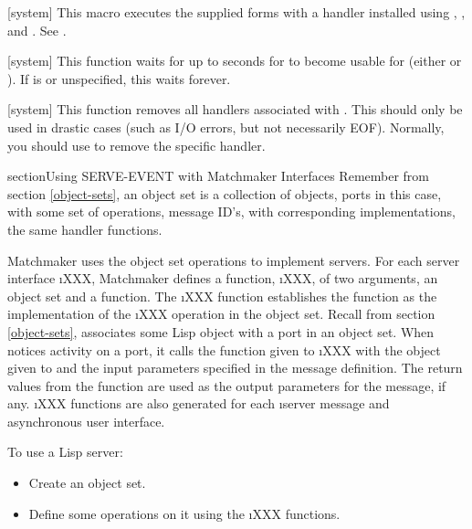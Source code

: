{[system]{
        }
 This macro executes the supplied forms with a handler installed using ,
, and .  See .
\enddefmac

[system]{
        }
 This function waits for up to  seconds for  to become usable
for  (either  or ).  If  is \nil{}
or unspecified, this waits forever.
\enddefun

[system]{}
This function removes all handlers associated with .  This should only be
used in drastic cases (such as I/O errors, but not necessarily EOF).  Normally,
you should use  to remove the specific handler.
\enddefun

\begin{ignore}

section{Using SERVE-EVENT with Matchmaker Interfaces}
\label{ipc-serve-mumbles}
Remember from section \ref{object-sets}, an object set is a collection of
objects, ports in this case, with some set of operations, message ID's, with
corresponding implementations, the same handler functions.

Matchmaker uses the object set operations to implement servers.  For each
server interface \i{XXX}, Matchmaker defines a function, \i{XXX}, of
two arguments, an object set and a function.  The \i{XXX} function
establishes the function as the implementation of the \i{XXX} operation in the
object set.  Recall from section \ref{object-sets}, 
associates some Lisp object with a port in an object set.  When
 notices activity on a port, it calls the function given
to \i{XXX} with the object given to  and
the input parameters specified in the message definition.  The return values
from the function are used as the output parameters for the message, if any.
\i{XXX} functions are also generated for each \i{server message} and
asynchronous user interface.

To use a Lisp server:
\begin{itemize}

\item
Create an object set.

\item
Define some operations on it using the \i{XXX} functions.


\end{itemize}
\end{ignore}}
